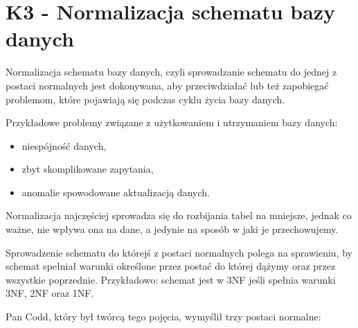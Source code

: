 \section{K3 - Normalizacja schematu bazy danych}

Normalizacja schematu bazy danych, czyli sprowadzanie schematu do jednej z postaci normalnych jest dokonywana, aby przeciwdziałać lub też zapobiegać problemom, które pojawiają się podczas cyklu życia bazy danych.

Przykładowe problemy związane z użytkowaniem i utrzymaniem bazy danych:
\begin{itemize}
	\item{niespójność danych,}
	\item{zbyt skomplikowane zapytania,}
	\item{anomalie spowodowane aktualizacją danych.}
\end{itemize}

Normalizacja najczęściej sprowadza się do rozbijania tabel na mniejsze, jednak co ważne, nie wpływa ona na dane, a jedynie na sposób w jaki je przechowujemy.

Sprowadzenie schematu do którejś z postaci normalnych polega na sprawieniu, by schemat spełniał warunki określone przez postać do której dążymy oraz przez wszystkie poprzednie. Przykładowo: schemat jest w 3NF jeśli spełnia warunki 3NF, 2NF oraz 1NF.

Pan Codd, który był twórcą tego pojęcia, wymyślił trzy postaci normalne:
\begin{itemize}
	\item{1NF - Przeciwdziała redundancji
\end{itemize}